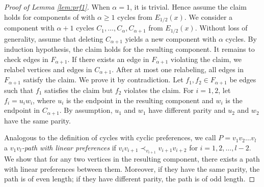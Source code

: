\documentclass[11pt]{article}
\numberwithin{theorem}{section}
\begin{document}
\begin{proof}[Proof of Lemma \ref{lem:prf1}]
When $\alpha=1$, it is trivial.
Hence assume the claim holds for components of with $\alpha\geq 1$ cycles from $E_{1/2}(x)$. We consider a component with $\alpha +1$ cycles $C_1, \ldots, C_{\alpha}, C_{\alpha+1}$ from $E_{1/2}(x)$. 
Without loss of generality, assume that deleting $C_{\alpha+1}$ yields a new component with $\alpha$ cycles.
By induction hypothesis, the claim holds for the resulting component. 
It remains to check edges in $F_{\alpha+1}$. If there exists an edge in $F_{\alpha+1}$ violating the claim, we relabel vertices and edges in $C_{\alpha+1}$. After at most one relabeling, all edges in $F_{\alpha+1}$ satisfy the claim. We prove it by contradiction. Let $f_1,f_2 \in F_{\alpha +1}$ be edges such that $f_1$ satisfies the claim but $f_2$ violates the claim. For $i=1,2$, let $f_i=u_i w_i$, where $u_i$ is the endpoint in the resulting component and $w_i$ is the endpoint in $C_{\alpha+1}$. By assumption, $u_1$ and $w_1$ have different parity and $u_2$ and $w_2$ have the same parity.

Analogous to the definition of cycles with cyclic preferences, we call $P=v_1 v_2 \ldots v_l$ a \textit{$v_1 v_l$-path with linear preferences} if $v_iv_{i+1}\prec_{v_{i+1}}v_{i+1}v_{i+2}$ for $i=1,2,\ldots,l-2$. We show that for any two vertices in the resulting component, there exists a path with linear preferences between them. Moreover, if they have the same parity, the path is of even length; if they have different parity, the path is of odd length. 


\end{proof}
\end{document}
